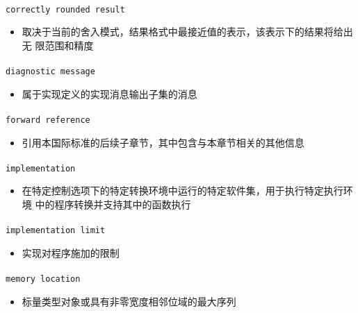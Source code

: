 \paragraph{}
\texttt{correctly rounded result}
\begin{itemize}
  \item[]{取决于当前的舍入模式，结果格式中最接近值的表示，该表示下的结果将给出无
    限范围和精度}
\end{itemize}

\paragraph{}
\texttt{diagnostic message}
\begin{itemize}
  \item[]{属于实现定义的实现消息输出子集的消息}
\end{itemize}

\paragraph{}
\texttt{forward reference}
\begin{itemize}
  \item[]{引用本国际标准的后续子章节，其中包含与本章节相关的其他信息}
\end{itemize}

\paragraph{}
\texttt{implementation}
\begin{itemize}
  \item[]{在特定控制选项下的特定转换环境中运行的特定软件集，用于执行特定执行环境
    中的程序转换并支持其中的函数执行}
\end{itemize}

\paragraph{}
\texttt{implementation limit}
\begin{itemize}
  \item[]{实现对程序施加的限制}
\end{itemize}

\paragraph{}
\texttt{memory location}
\begin{itemize}
  \item[]{标量类型对象或具有非零宽度相邻位域的最大序列}
\end{itemize}

